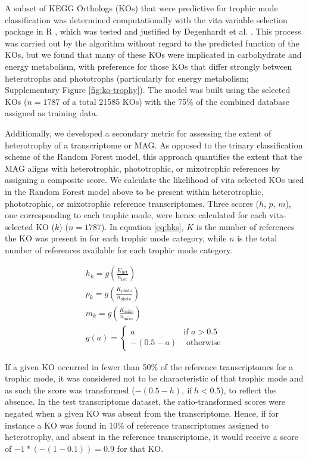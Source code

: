 \documentclass[12pt]{article}
\numberwithin{equation}{section}
\begin{document}
A subset of KEGG Orthologs (KOs) that were predictive for trophic mode classification was determined computationally with the vita variable selection package in R \citep{Janitza_2016}, which was tested and justified by Degenhardt et al. \citet{Degenhardt_2017}. This process was carried out by the algorithm without regard to the predicted function of the KOs, but we found that many of these KOs were implicated in carbohydrate and energy metabolism, with preference for those KOs that differ strongly between heterotrophs and phototrophs (particularly for energy metabolism; Supplementary Figure \ref{fig:ko-trophy}). The model was built using the selected KOs ($n=1787$ of a total 21585 KOs) with the 75\% of the combined database assigned as training data.

Additionally, we developed a secondary metric for assessing the extent of heterotrophy of a transcriptome or MAG. As opposed to the trinary classification scheme of the Random Forest model, this approach quantifies the extent that the MAG aligns with heterotrophic, phototrophic, or mixotrophic references by assigning a composite score. We calculate the likelihood of vita selected KOs used in the Random Forest model above to be present within heterotrophic, phototrophic, or mixotrophic reference transcriptomes. Three scores ($h$, $p$, $m$), one corresponding to each trophic mode, were hence calculated for each vita-selected  KO ($k$) ($n=1787$). In equation \ref{eq:hks}, $K$ is the number of references the KO was present in for each trophic mode category, while $n$ is the total number of references available for each trophic mode category.

\begin{gather}\label{eq:hks}
    h_k = g\left(\frac{K_\textrm{het}}{n_\textrm{het}}\right)\\
    p_k = g\left(\frac{K_\textrm{photo}}{n_\textrm{photo}}\right)\\
    m_k = g\left(\frac{K_\textrm{mixo}}{n_\textrm{mixo}}\right)\\
    g(a) = \begin{cases}
       a & \textrm{if } a > 0.5 \\
       -(0.5-a) & \textrm{ otherwise} \label{eq:connectfinal}
    \end{cases} 
\end{gather}

If  a given KO occurred in fewer than 50\% of the reference transcriptomes for a trophic mode, it was considered not to be characteristic of that trophic mode and as such the score was transformed ($-(0.5 - h),\ \text{if} \ h<0.5$), to reflect the absence. In the test transcriptome dataset, the ratio-transformed scores were negated when a given KO was absent from the transcriptome. Hence, if for instance a KO was found in 10\% of reference transcriptomes assigned to heterotrophy, and absent in the reference transcriptome, it would receive a score of $-1 * (-(1-0.1)) = 0.9$ for that KO.
\end{document}
